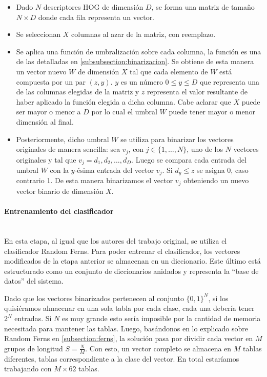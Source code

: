 			\begin{itemize}
				\item Dado $N$ descriptores HOG de dimensión $D$, se forma una matriz de tamaño $N \times D$ donde cada fila representa un vector.
				\item Se seleccionan $X$ columnas al azar de la matriz, con reemplazo.
				\item Se aplica una función de umbralización sobre cada columna, la función es una de las detalladas en \ref{subsubsection:binarizacion}. Se obtiene de esta manera un vector nuevo $W$ de dimensión $X$ tal que cada elemento de $W$ está compuesta por un par $(z,y)$. $y$ es un número $0 \leq y \leq D$ que representa una de las columnas elegidas de la matriz y $z$ representa el valor resultante de haber aplicado la función elegida a dicha columna. Cabe aclarar que $X$ puede ser mayor o menor a $D$ por lo cual el umbral $W$ puede tener mayor o menor dimensión al final.
				\item Posteriormente, dicho umbral $W$ se utiliza para binarizar los vectores originales de manera sencilla: sea $v_j$, con $j \in \{1,\dots,N\}$, uno de los $N$ vectores originales y tal que $v_j = d_1,d_2,\dots,d_D$. Luego se compara cada entrada del umbral $W$ con la $y$-ésima entrada del vector $v_j$. Si $d_y \leq z$ se asigna 0, caso contrario 1. De esta manera binarizamos el vector $v_j$ obteniendo un nuevo vector binario de dimensión $X$.
			
			\end{itemize}

		\paragraph{Entrenamiento del clasificador}  ~\\

			En esta etapa, al igual que los autores del trabajo original, se utiliza el clasificador Random Ferns. Para poder entrenar el clasificador, los vectores modificados de la etapa anterior se almacenan en un diccionario. Este último está estructurado como un conjunto de diccionarios anidados y representa la ``base de datos'' del sistema.

			Dado que los vectores binarizados pertenecen al conjunto $\{ 0,1 \}^{N}$, si los quisiéramos almacenar en una sola tabla por cada clase, cada una debería tener $2^{N}$ entradas. Si $N$ es muy grande esto sería imposible por la cantidad de memoria necesitada para mantener las tablas. Luego, basándonos en lo explicado sobre Random Ferns en \ref{subsection:ferns}, la solución pasa por dividir cada vector en $M$ grupos de longitud $S = \frac{N}{M}$. Con esto, un vector completo se almacena en $M$ tablas diferentes, tablas correspondiente a la clase del vector. En total estaríamos trabajando con $M \times 62$ tablas.

